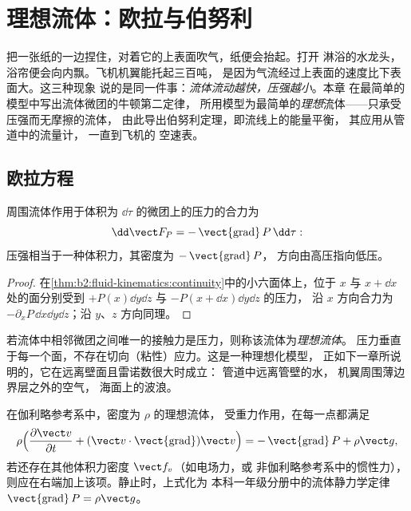 \chapter{理想流体：欧拉与伯努利}\label{ch:b2:euler-bernoulli}

把一张纸的一边捏住，对着它的上表面吹气，纸便会抬起。打开
淋浴的水龙头，浴帘便会向内飘。飞机机翼能托起三百吨，
是因为气流经过上表面的速度比下表面大。这三种现象
说的是同一件事：\emph{流体流动越快，压强越小}。本章
在最简单的模型中写出流体微团的牛顿第二定律，
所用模型为最简单的\emph{理想}流体——只承受压强而无摩擦的流体，
由此导出伯努利定理，即流线上的能量平衡，
其应用从管道中的流量计，
一直到飞机的
空速表。

\section{欧拉方程}

\begin{proposition}[流体微团所受的压力]\label{prop:b2:euler-bernoulli:pressure}
周围流体作用于体积为
$\dd\tau$ 的微团上的压力的合力为
\[
\dd\vect F_P = -\operatorname{\vect{grad}}P\,\dd\tau :
\]
压强相当于一种体积力，其密度为 $-\operatorname{\vect{grad}}P$，
方向由高压指向低压。
\end{proposition}

\begin{proof}
在\cref{thm:b2:fluid-kinematics:continuity}中的小六面体上，位于
$x$ 与 $x + \dd x$ 处的面分别受到 $+P(x)\dd y\dd z$ 与 $-P(x + \dd x)\dd y\dd z$ 的压力，
沿 $x$ 方向合力为 $-\partial_xP\,\dd x\dd y\dd z$；沿 $y$、$z$ 方向同理。
\end{proof}

\begin{definition}[理想流体]\label{def:b2:euler-bernoulli:perfect}
若流体中相邻微团之间唯一的接触力是压力，则称该流体为\emph{理想流体}。
压力垂直于每一个面，不存在切向（粘性）应力。这是一种理想化模型，
正如下一章所说明的，它在远离壁面且雷诺数很大时成立：
管道中远离管壁的水，
机翼周围薄边界层之外的空气，
海面上的波浪。
\end{definition}

\begin{theorem}[欧拉方程]\label{thm:b2:euler-bernoulli:euler}
在伽利略参考系中，密度为 $\rho$ 的理想流体，
受重力作用，在每一点都满足
\[
\rho\Bigl(\frac{\partial\vect v}{\partial t} + (\vect v\cdot\operatorname{\vect{grad}})
\vect v\Bigr) = -\operatorname{\vect{grad}}P + \rho\vect g ,
\]
若还存在其他体积力密度 $\vect f_v$（如电场力，或
非伽利略参考系中的惯性力），则应在右端加上该项。静止时，上式化为
本科一年级分册中的流体静力学定律
$\operatorname{\vect{grad}}P = \rho\vect g$。
\end{theorem}

